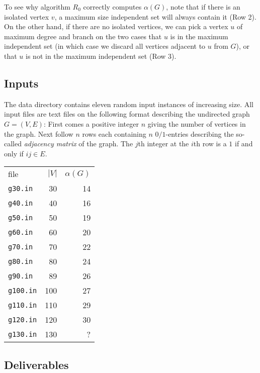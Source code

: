 \documentclass{tufte-handout}
\begin{document}
To see why algorithm $R_0$ correctly computes $\alpha(G)$, note that
if there is an isolated vertex $v$, a maximum size independent set
will always contain it (Row 2).
On the other hand, if there are no isolated vertices, we can pick a
vertex $u$ of maximum degree and branch on the two cases that $u$ is
in the maximum independent set (in which case we discard all vertices
adjacent to $u$ from $G$), or that $u$ is not in the maximum
independent set (Row 3).

\subsection{Inputs}

The data directory contains eleven random input instances of
increasing size. 
All input files are text files on the following format describing the
undirected graph $G=(V,E)$: First comes a positive integer $n$ giving
the number of vertices in the graph.
Next follow $n$ rows each containing $n$ $0/1$-entries describing the
so-called \emph{adjacency matrix} of the graph.
The $j$th integer at the $i$th row is a $1$ if and only if $ij\in E$.

\begin{marginfigure}
\begin{tabular}{lrr}
file & $|V|$ & $\alpha(G)$\\
 \texttt{g30.in} & 30 & 14\\
 \texttt{g40.in} & 40 & 16\\
 \texttt{g50.in} & 50 & 19\\
 \texttt{g60.in} & 60 & 20\\
 \texttt{g70.in} & 70 & 22\\
 \texttt{g80.in} & 80 & 24\\
 \texttt{g90.in} & 89 & 26\\
 \texttt{g100.in} & 100 & 27\\
 \texttt{g110.in} & 110 & 29\\
 \texttt{g120.in} & 120 & 30\\
 \texttt{g130.in} & 130 &  ? 
\end{tabular}
\end{marginfigure}



\subsection{Deliverables}
\end{document}
